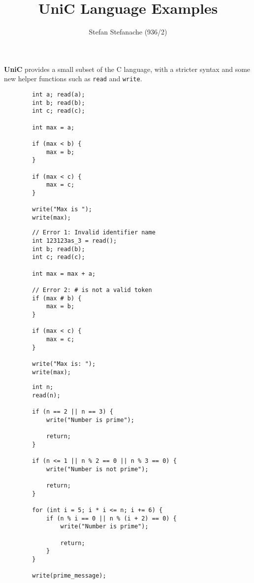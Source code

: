 \documentclass{article}[12pt]
\title{\textbf{UniC Language Examples}}
\author{Stefan Stefanache (936/2)}
\date{}
\begin{document}
    \maketitle

    \textbf{UniC} provides a small subset of the C language, with a stricter
    syntax and some new helper functions such as \texttt{read} and \texttt{write}.

    \begin{tcolorbox}[
        standard jigsaw,
        title=P1. Compute the maximum of 3 numbers,
        opacityback=0]
    \begin{verbatim}
        int a; read(a);
        int b; read(b);
        int c; read(c);

        int max = a;

        if (max < b) {
            max = b;
        }

        if (max < c) {
            max = c;
        }

        write("Max is ");
        write(max);
    \end{verbatim}
    \end{tcolorbox}

    \begin{tcolorbox}[
        standard jigsaw,
        title=\textbf{ERR\_P1. Compute the maximum of 3 numbers (with 2 errors)},
        colframe=red,
        coltitle=black,
        opacityback=0]
    \begin{verbatim}
        // Error 1: Invalid identifier name
        int 123123as_3 = read();
        int b; read(b);
        int c; read(c);

        int max = max + a; 

        // Error 2: # is not a valid token
        if (max # b) {
            max = b;
        }

        if (max < c) {
            max = c;
        }

        write("Max is: ");
        write(max);
    \end{verbatim}
    \end{tcolorbox}

    \begin{tcolorbox}[
        standard jigsaw,
        title=P2. Check if a number is prime,
        opacityback=0]
    \begin{verbatim}
        int n;
        read(n);

        if (n == 2 || n == 3) {
            write("Number is prime");

            return;
        }

        if (n <= 1 || n % 2 == 0 || n % 3 == 0) {
            write("Number is not prime");
        
            return;
        } 
        
        for (int i = 5; i * i <= n; i += 6) {
            if (n % i == 0 || n % (i + 2) == 0) {
                write("Number is prime");

                return;
            }
        }

        write(prime_message);
    \end{verbatim}
    \end{tcolorbox}
\end{document}
